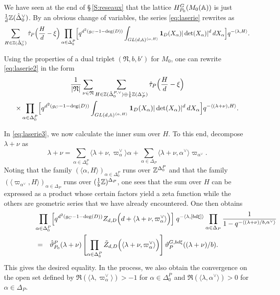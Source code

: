 \begin{paragr}
\begin{preuve}
We have seen at the end of \S\,\ref{S:reseaux} that the lattice $H_{P_0}^G(M_0(\mathbb{A}))$ is just $\frac{1}{d}\mathbb{Z}(\hat{\Delta}_0^\vee)$. By an obvious change of variables, the series \eqref{eq:laserie} rewrites as
\begin{equation}
  \label{eq:laserie2}
  \sum_{H\in \mathbb{Z}(\hat{\Delta}_0^\vee)} \hat{\tau}_P\Bigl(\frac{H}{d}-\xi\Bigr) \prod_{\alpha\in \Delta_0^P} \Bigl[  q^{d^2(g_C-1-\deg(D))}  \int_{ GL(d,\mathbb{A})^{\langle \alpha, H\rangle}}\mathbf{1}_D(X_\alpha)|\det(X_\alpha)|^d\, dX_\alpha\Bigr]   q^{-\langle \lambda, H\rangle}.
\end{equation}

Using the properties of a dual triplet $(\mathfrak{N},b,b')$ for $M_0$, one can rewrite \eqref{eq:laserie2} in the form
\begin{multline}
  \label{eq:laserie3}
  \frac1{|\mathfrak{N}|} \sum_{\nu \in \mathfrak{N}}   \sum_{H\in \mathbb{Z}(\hat{\Delta}_0^{P,\vee})\oplus \frac1b \mathbb{Z}(\Delta_P^\vee)} \hat{\tau}_P\Bigl(\frac{H}{d}-\xi\Bigr)\\
  \times \prod_{\alpha\in \Delta_0^P} \Bigl[  q^{d^2(g_C-1-\deg(D))}  \int_{ GL(d,\mathbb{A})^{\langle \alpha, H\rangle}}\mathbf{1}_D(X_\alpha)|\det(X_\alpha)|^d\, dX_\alpha\Bigr]   q^{-\langle (\lambda+\nu), H\rangle}.
\end{multline}

In \eqref{eq:laserie3}, we now calculate the inner sum over $H$. To this end, decompose $\lambda+\nu$ as
$$\lambda+\nu= \sum_{\alpha \in \Delta_{0}^P} \langle \lambda+\nu, \varpi_\alpha^\vee \rangle \alpha+\sum_{\alpha \in \Delta_P} \langle \lambda+\nu, \alpha^\vee \rangle \varpi_{\alpha^\vee}.$$
Noting that the family $(\langle \alpha, H \rangle)_{\alpha \in \Delta_{0}^P }$ runs over $\mathbb{Z}^{\Delta_{0}^P}$ and that the family $(\langle \varpi_{\alpha^\vee}, H \rangle)_{\alpha \in \Delta_P }$ runs over $(\frac1b \mathbb{Z})^{\Delta_P }$, one sees that the sum over $H$ can be expressed as a product whose certain factors yield a zeta function while the others are geometric series that we have already encountered. One then obtains
\begin{eqnarray}
  \lefteqn{\prod_{\alpha\in \Delta_0^P} \Bigl[  q^{d^2(g_C-1-\deg(D))} Z_{d,D}\Bigl(d+ \langle \lambda+\nu, \varpi_\alpha^\vee \rangle\Bigr)\Bigr] \; q^{-\langle \lambda, [bd \xi]\rangle} \prod_{\alpha\in \Delta_P} \frac{1}{1-q^{-\langle (\lambda+\nu)/b,\alpha^\vee \rangle}}} \nonumber\\
  &=& \hat{\vartheta}_{P_0}^P(\lambda+\nu) \, \Biggl[\prod_{\alpha\in \Delta_0^P} \tilde{Z}_{d,D}\Bigl(\langle \lambda+\nu, \varpi_\alpha^\vee \rangle\Bigr)\Biggr] \, \vartheta_{P}^{G,bd\xi}((\lambda+\nu)/b).
  \label{eq:calcul-interne}
\end{eqnarray}
This gives the desired equality. In the process, we also obtain the convergence on the open set defined by $\Re(\langle \lambda,\varpi_\alpha^\vee\rangle)>-1$ for $\alpha\in \Delta_0^P$ and $\Re(\langle \lambda,\alpha^\vee\rangle)>0$ for $\alpha\in \Delta_P$.
\end{preuve}


\end{paragr}
